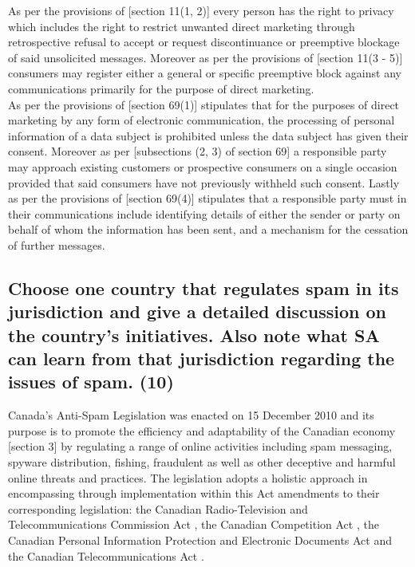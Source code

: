 \documentclass[11pt]{article}
\begin{document}
As per the provisions of [section 11(1, 2)]\cite{rsa08_cpa} every
person has the right to privacy which includes the right to restrict unwanted
direct marketing through retrospective refusal to accept or request
discontinuance or preemptive blockage of said unsolicited messages. Moreover as
per the provisions of [section 11(3 - 5)]\cite{rsa08_cpa}
consumers may register either a general or specific preemptive block against any
communications primarily for the purpose of direct marketing.\\

As per the provisions of [section 69(1)]\cite{rsa13_popi} stipulates that for the
purposes of direct marketing by any form of electronic communication, the
processing of personal information of a data subject is prohibited unless the
data subject has given their consent. Moreover as per [subsections (2, 3) of
section 69]\cite{rsa13_popi} a responsible party may approach existing customers
or prospective consumers on a single occasion provided that said consumers have
not previously withheld such consent. Lastly as per the provisions of [section
69(4)]\cite{rsa13_popi} stipulates that a responsible party must in their
communications include identifying details of either the sender or party on
behalf of whom the information has been sent, and a mechanism for the cessation
of further messages.

\subsection{Choose one country that regulates spam in its jurisdiction and give a detailed discussion on the country's initiatives. Also note what SA can learn from that jurisdiction regarding the issues of spam. (10)}
\label{sec:orgba8fdd6}

Canada's Anti-Spam Legislation \cite{ca10_anti_spam_act} was enacted on 15
December 2010 and its purpose is to promote the efficiency and adaptability of
the Canadian economy [section 3]\cite{ca10_anti_spam_act} by regulating a range of
online activities including spam messaging, spyware distribution, fishing,
fraudulent as well as other deceptive and harmful online threats and practices.
The legislation adopts a holistic approach in encompassing through
implementation within this Act amendments to their corresponding legislation:
the Canadian Radio-Television and Telecommunications Commission Act
\cite{ca85_radio_tv_telecomms_act}, the Canadian Competition Act
\cite{ca85_comp_act}, the Canadian Personal Information Protection and Electronic
Documents Act \cite{ca00_popi_act} and the Canadian Telecommunications Act
\cite{ca93_telecomms_act}.\\
\end{document}
